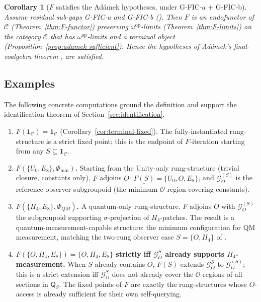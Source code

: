 \documentclass[11pt, a4paper]{amsart}
\newtheorem{corollary}[theorem]{Corollary}
\theoremstyle{definition}
\newcommand{\catC}{\mathcal{C}}
\newcommand{\Gcal}{\mathcal{G}}
\newcommand{\Qalg}{\mathsf{Q}}
\begin{document}
\begin{corollary}[$F$ satisfies the Ad\'amek hypotheses, under
  G-FIC-a + G-FIC-b]
\label{cor:F-adamek-ready}
Assume residual sub-gaps G-FIC-a and G-FIC-b
(\cite{CascadeHFICClosure}). Then $F$ is an endofunctor of
$\catC$ (Theorem~\ref{thm:F-functor}) preserving
$\omega^{\mathrm{op}}$-limits
(Theorem~\ref{thm:F-limits}) on the category $\catC$ that has
$\omega^{\mathrm{op}}$-limits and a terminal object
(Proposition~\ref{prop:adamek-sufficient}). Hence the hypotheses
of Ad\'amek's final-coalgebra theorem
\cite[Thm.~2.1]{Adamek1974}, \cite[Thm.~7.1]{Rutten2000} are
satisfied.
\end{corollary}

\subsection{Examples}
\label{subsec:F-examples}

The following concrete computations ground the definition and
support the identification theorem of
Section~\ref{sec:identification}.

\begin{enumerate}
\item \textbf{$F(\mathbf{1}_\catC) = \mathbf{1}_\catC$}
  (Corollary~\ref{cor:terminal-fixed}). The fully-instantiated
  rung-structure is a strict fixed point; this is the endpoint of
  $F$-iteration starting from any $S \subseteq \mathbf{1}_\catC$.

\item \textbf{$F(\{U_0, E_8\}, \Phi_{\min})$.} Starting from the
  Unity-only rung-structure (trivial closure, constants only),
  $F$ adjoins $O$: $\underline{F(S)} = \{U_0, O, E_8\}$, and
  $\Gcal_O^{(S)}$ is the reference-observer subgroupoid (the
  minimum $\mathcal{O}$-region covering constants).

\item \textbf{$F(\{H_4, E_8\}, \Phi_{QM})$.} A quantum-only
  rung-structure. $F$ adjoins $O$ with $\Gcal_O^{(S)}$ the
  subgroupoid supporting $\sigma$-projection of $H_4$-patches.
  The result is a quantum-measurement-capable structure: the
  minimum configuration for QM measurement, matching the
  two-rung observer case $S = \{O, H_4\}$ of
  \cite[\S3.2, \S6.2]{CascadeObserverQueryAlgebra}.

\item \textbf{$F(\{O, H_4, E_8\}) = \{O, H_4, E_8\}$ strictly
  iff $\Gcal_O^S$ already supports $H_4$-measurement.} When $S$
  already contains $O$, $F(S)$ extends $\Gcal_O^S$ to
  $\Gcal_O^{(S)}$; this is a strict extension iff $\Gcal_O^S$
  does not already cover the $\mathcal{O}$-regions of all
  sections in $\Qalg_S$. The fixed points of $F$ are exactly
  the rung-structures whose $O$-access is already sufficient
  for their own self-querying.
\end{enumerate}
\end{document}
